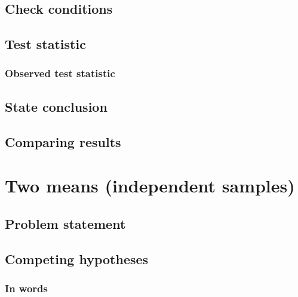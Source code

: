 \documentclass[12pt, krantz2,]{krantz}
\begin{document}
\hypertarget{check-conditions-2}{%
\subsection{Check conditions}\label{check-conditions-2}}

\hypertarget{test-statistic-2}{%
\subsection{Test statistic}\label{test-statistic-2}}

\hypertarget{observed-test-statistic-2}{%
\subsubsection*{Observed test statistic}\label{observed-test-statistic-2}}


\hypertarget{state-conclusion-2}{%
\subsection{State conclusion}\label{state-conclusion-2}}

\hypertarget{comparing-results-2}{%
\subsection{Comparing results}\label{comparing-results-2}}

\hypertarget{two-means-independent-samples}{%
\section{Two means (independent samples)}\label{two-means-independent-samples}}

\hypertarget{problem-statement-3}{%
\subsection{Problem statement}\label{problem-statement-3}}

\hypertarget{competing-hypotheses-3}{%
\subsection{Competing hypotheses}\label{competing-hypotheses-3}}

\hypertarget{in-words-3}{%
\subsubsection*{In words}\label{in-words-3}}
\end{document}
